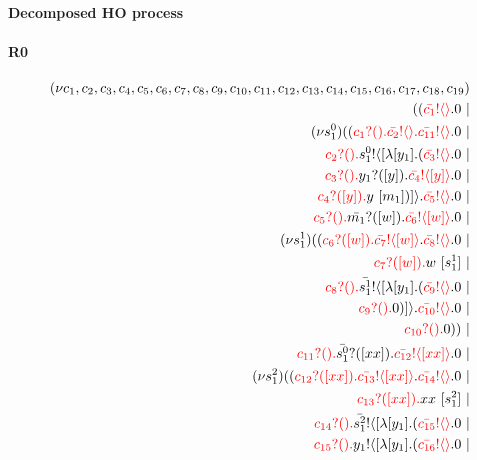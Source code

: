 \documentclass{article}
\begin{document}
\paragraph{Decomposed HO process}\paragraph{R0}
\begin{align*}
 (\nu c_{1},c_{2},c_{3},c_{4},c_{5},c_{6},c_{7},c_{8},c_{9},c_{10},c_{11},c_{12},c_{13},c_{14},c_{15},c_{16},c_{17},c_{18},c_{19}) \\ ((\color{red}\bar{c_{1}}! \langle  \rangle \color{black}.0  \ | \\  (\nu s^{0}_{1})((\color{red}c_{1}?().\color{black}\color{red}\bar{c_{2}}! \langle  \rangle \color{black}.\color{red}\bar{c_{11}}! \langle  \rangle \color{black}.0  \ | \\ \color{red}c_{2}?().\color{black}\color{black}s^{0}_{1}! \langle [ \lambda [y_{1}].(\color{red}\bar{c_{3}}! \langle  \rangle \color{black}.0  \ | \\ \color{red}c_{3}?().\color{black}\color{black}y_{1}?([y]).\color{black}\color{red}\bar{c_{4}}! \langle [y] \rangle \color{black}.0  \ | \\ \color{red}c_{4}?([y]).\color{black}y \ [m_{1}])] \rangle \color{black}.\color{red}\bar{c_{5}}! \langle  \rangle \color{black}.0  \ | \\ \color{red}c_{5}?().\color{black}\color{black}\bar{m_{1}}?([w]).\color{black}\color{red}\bar{c_{6}}! \langle [w] \rangle \color{black}.0  \ | \\  (\nu s^{1}_{1})((\color{red}c_{6}?([w]).\color{black}\color{red}\bar{c_{7}}! \langle [w] \rangle \color{black}.\color{red}\bar{c_{8}}! \langle  \rangle \color{black}.0  \ | \\ \color{red}c_{7}?([w]).\color{black}w \ [s^{1}_{1}] \ | \\ \color{red}c_{8}?().\color{black}\color{black}\bar{s^{1}_{1}}! \langle [ \lambda [y_{1}].(\color{red}\bar{c_{9}}! \langle  \rangle \color{black}.0  \ | \\ \color{red}c_{9}?().\color{black}0 )] \rangle \color{black}.\color{red}\bar{c_{10}}! \langle  \rangle \color{black}.0  \ | \\ \color{red}c_{10}?().\color{black}0 )) \ | \\ \color{red}c_{11}?().\color{black}\color{black}\bar{s^{0}_{1}}?([xx]).\color{black}\color{red}\bar{c_{12}}! \langle [xx] \rangle \color{black}.0  \ | \\  (\nu s^{2}_{1})((\color{red}c_{12}?([xx]).\color{black}\color{red}\bar{c_{13}}! \langle [xx] \rangle \color{black}.\color{red}\bar{c_{14}}! \langle  \rangle \color{black}.0  \ | \\ \color{red}c_{13}?([xx]).\color{black}xx \ [s^{2}_{1}] \ | \\ \color{red}c_{14}?().\color{black}\color{black}\bar{s^{2}_{1}}! \langle [ \lambda [y_{1}].(\color{red}\bar{c_{15}}! \langle  \rangle \color{black}.0  \ | \\ \color{red}c_{15}?().\color{black}\color{black}y_{1}! \langle [ \lambda [y_{1}].(\color{red}\bar{c_{16}}! \langle  \rangle \color{black}.0  \ | 
\end{align*}
\end{document}
